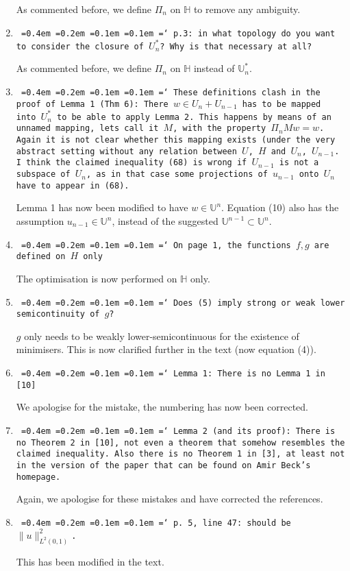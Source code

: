\documentclass[12pt]{article}
\newcommand*\justify{%
	\fontdimen2\font=0.4em%
	\fontdimen3\font=0.2em%
	\fontdimen4\font=0.1em%
	\fontdimen7\font=0.1em%
	\hyphenchar\font=`\-%
}
\newcommand{\review}[1]{\texttt{\justify{#1}}}
\newcommand{\F}[1]{\mathbb{#1}}
\begin{document}
\begin{enumerate}
	As commented before, we define $\Pi_n$ on $\F H$ to remove any ambiguity.
	
	\item \review{p.3: in what topology do you want to consider the closure of $U_n^*$? Why is that necessary at all?}
	
	As commented before, we define $\Pi_n$ on $\F H$ instead of $\F U_n^*$.	
	
	\item \review{These definitions clash in the proof of Lemma 1 (Thm 6): There $w\in U_n+U_{n-1}$ has to be mapped into $U_n^*$ to be able to apply Lemma 2. This happens by means of an unnamed mapping, lets call it $M$, with the property $\Pi_nMw=w$. Again it is not clear whether this mapping exists (under the very abstract setting without any relation between $U$, $H$ and $U_n$, $U_{n-1}$. I think the claimed inequality (68) is wrong if $U_{n-1}$ is not a subspace of $U_n$, as in that case some projections of $u_{n-1}$ onto $U_n$ have to appear in (68).}
	
	Lemma 1 has now been modified to have $w\in \F U^n$. Equation (10) also has the assumption $u_{n-1}\in \F U^n$, instead of the suggested $\F U^{n-1}\subset \F U^n$.
	
	\item \review{On page 1, the functions $f,g$ are defined on $H$ only}
	
	The optimisation is now performed on $\F H$ only.
	
	\item \review{Does (5) imply strong or weak lower semicontinuity of $g$?}
	
	$g$ only needs to be weakly lower-semicontinuous for the existence of minimisers. This is now clarified further in the text (now equation (4)).
	
	\item \review{Lemma 1: There is no Lemma 1 in [10]}
	
	We apologise for the mistake, the numbering has now been corrected.
	
	\item \review{Lemma 2 (and its proof): There is no Theorem 2 in [10], not even a theorem that somehow resembles the claimed inequality. Also there is no Theorem 1 in [3], at least not in the version of the paper that can be found on Amir Beck's homepage.}
	
	Again, we apologise for these mistakes and have corrected the references.
	
	\item \review{p. 5, line 47: should be $\lVert u\rVert_{L^2(0,1)}^2$.}
	
	This has been modified in the text.
\end{enumerate}
\end{document}
